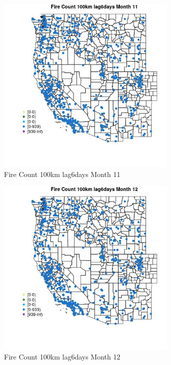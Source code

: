 \begin{figure} 
\centering  
\includegraphics[width=0.77\textwidth]{Code_Outputs/Report_ML_input_PM25_Step4_part_e_de_duplicated_aves_compiled_2019-05-21wNAs_MapObsMo11Fire_Count_100km_lag6days.jpg} 
\caption{\label{fig:Report_ML_input_PM25_Step4_part_e_de_duplicated_aves_compiled_2019-05-21wNAsMapObsMo11Fire_Count_100km_lag6days}Fire Count 100km lag6days Month 11} 
\end{figure} 
 

\begin{figure} 
\centering  
\includegraphics[width=0.77\textwidth]{Code_Outputs/Report_ML_input_PM25_Step4_part_e_de_duplicated_aves_compiled_2019-05-21wNAs_MapObsMo12Fire_Count_100km_lag6days.jpg} 
\caption{\label{fig:Report_ML_input_PM25_Step4_part_e_de_duplicated_aves_compiled_2019-05-21wNAsMapObsMo12Fire_Count_100km_lag6days}Fire Count 100km lag6days Month 12} 
\end{figure} 
 

